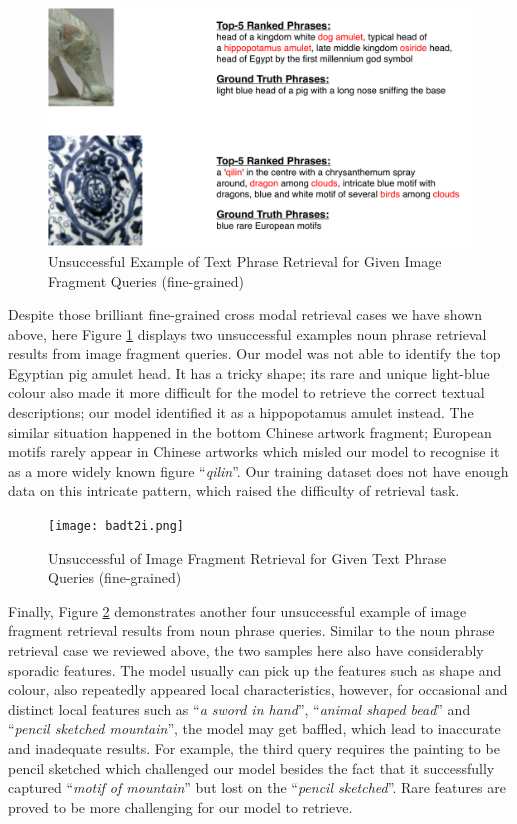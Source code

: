 \begin{figure}[h!]
\centering
\includegraphics[width=.8\textwidth]{badi2t.pdf}
\caption{Unsuccessful Example of Text Phrase Retrieval for Given Image Fragment Queries (fine-grained)}
\label{fig:badi2t}
\end{figure}

Despite those brilliant fine-grained cross modal retrieval cases we have shown above, here Figure \ref{fig:badi2t} displays two unsuccessful examples noun phrase retrieval results from image fragment queries. Our model was not able to identify the top Egyptian pig amulet head. It has a tricky shape; its rare and unique light-blue colour also made it more difficult for the model to retrieve the correct textual descriptions; our model identified it as a hippopotamus amulet instead. The similar situation happened in the bottom Chinese artwork fragment; European motifs rarely appear in Chinese artworks which misled our model to recognise it as a more widely known figure ``\textit{qilin}''. Our training dataset does not have enough data on this intricate pattern, which raised the difficulty of retrieval task. 

\begin{figure}[h!]
\centering
\texttt{[image: badt2i.png]}
\caption{Unsuccessful of Image Fragment Retrieval for Given Text Phrase Queries (fine-grained)}
\label{fig:badt2i}
\end{figure}

Finally, Figure \ref{fig:badt2i} demonstrates another four unsuccessful example of image fragment retrieval results from noun phrase queries. Similar to the noun phrase retrieval case we reviewed above, the two samples here also have considerably sporadic features. The model usually can pick up the features such as shape and colour, also repeatedly appeared local characteristics, however, for occasional and distinct local features such as ``\textit{a sword in hand}'', ``\textit{animal shaped bead}'' and ``\textit{pencil sketched mountain}'', the model may get baffled, which lead to inaccurate and inadequate results. For example, the third query requires the painting to be pencil sketched which challenged our model besides the fact that it successfully captured ``\textit{motif of mountain}'' but lost on the ``\textit{pencil sketched}''. Rare features are proved to be more challenging for our model to retrieve.

